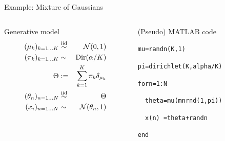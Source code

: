\begin{frame}{Example: Mixture of Gaussians}
  \begin{columns}
    \begin{column}{.47\textwidth}
      \begin{block}{Generative model}
        \begin{eqnarray*}
          (\mu_k)_{k=1\ldots K} & \stackrel{\mathrm{iid}}{\sim} & \mathcal{N}(0, 1) \\
          (\pi_k)_{k=1\ldots K} & \sim & \textrm{Dir}(\alpha/K) \\
          \Theta & := & \sum_{k=1}^K \pi_k \delta_{\mu_k} \\
          (\theta_n)_{n=1\ldots N} & \stackrel{\mathrm{iid}}{\sim} & \Theta \\
          (x_i)_{n=1\ldots N} & \sim & \mathcal{N}(\theta_n, 1)
        \end{eqnarray*}
      \end{block}
    \end{column}
    \begin{column}{.47\textwidth}
      \begin{block}{(Pseudo) MATLAB code}
        \vspace{0.75\baselineskip}
        \begin{alltt}
          mu = randn(K,1)

          pi = dirichlet(K, alpha/K)

          for n = 1:N
            
          \ \ theta = mu(mnrnd(1,pi))
          
          \ \ x(n) \ = theta + randn
            
          end
        \end{alltt}
        \vspace{0.75\baselineskip}
      \end{block}
    \end{column}
  \end{columns}
\end{frame}

